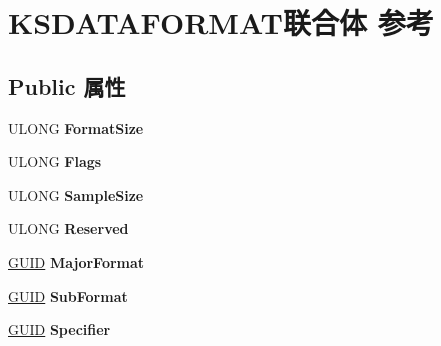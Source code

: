 \hypertarget{struct_k_s_d_a_t_a_f_o_r_m_a_t}{}\section{K\+S\+D\+A\+T\+A\+F\+O\+R\+M\+A\+T联合体 参考}
\label{struct_k_s_d_a_t_a_f_o_r_m_a_t}
\subsection*{Public 属性}
\begin{DoxyCompactItemize}
\item 
\mbox{\label{struct_k_s_d_a_t_a_f_o_r_m_a_t_aa23bba961cb89d7c270b76c997bc82bd}} 
U\+L\+O\+NG {\bfseries Format\+Size}
\item 
\mbox{\label{struct_k_s_d_a_t_a_f_o_r_m_a_t_a5ac62313a7451af29843a36ab8f36498}} 
U\+L\+O\+NG {\bfseries Flags}
\item 
\mbox{\label{struct_k_s_d_a_t_a_f_o_r_m_a_t_afcc41adbaf122f7345b49bc4e2554a6f}} 
U\+L\+O\+NG {\bfseries Sample\+Size}
\item 
\mbox{\label{struct_k_s_d_a_t_a_f_o_r_m_a_t_a7f0a5c20555a3882711fdf9494fefaf3}} 
U\+L\+O\+NG {\bfseries Reserved}
\item 
\mbox{\label{struct_k_s_d_a_t_a_f_o_r_m_a_t_a71601273fdfb0ceee3866f02187b517e}} 
\hyperlink{interface_g_u_i_d}{G\+U\+ID} {\bfseries Major\+Format}
\item 
\mbox{\label{struct_k_s_d_a_t_a_f_o_r_m_a_t_a58a48636b6942b0f4676ee0861ea6386}} 
\hyperlink{interface_g_u_i_d}{G\+U\+ID} {\bfseries Sub\+Format}
\item 
\mbox{\label{struct_k_s_d_a_t_a_f_o_r_m_a_t_a05a04e431afcc9d5a007bce301156c8c}} 
\hyperlink{interface_g_u_i_d}{G\+U\+ID} {\bfseries Specifier}
\item 
\mbox{\label{struct_k_s_d_a_t_a_f_o_r_m_a_t_a7e0ce4416176e9b5bdec8d5d65da800b}} 

\end{DoxyCompactItemize}
